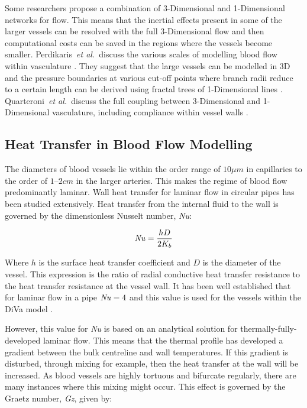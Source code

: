 \documentclass[11pt,english,a4paper,twoside,openright]{report}
\newcommand\Nuss{\mbox{\textit{Nu}}}
\newcommand\Graetz{\mbox{\textit{Gz}}}
\begin{document}
{{{{{{{{	Some researchers propose a combination of 3-Dimensional and 1-Dimensional networks for flow. This means that the inertial effects present in some of the larger vessels can be resolved with the full 3-Dimensional flow and then computational costs can be saved in the regions where the vessels become smaller. Perdikaris~\textit{et al.\ }discuss the various scales of modelling blood flow within vasculature \cite{perdikaris2016multiscale}. They suggest that the large vessels can be modelled in 3D and the pressure boundaries at various cut-off points where branch radii reduce to a certain length can be derived using fractal trees of 1-Dimensional lines \cite{perdikaris2015effective}. Quarteroni~\textit{et al.\ }discuss the full coupling between 3-Dimensional and 1-Dimensional vasculature, including compliance within vessel walls \cite{quarteroni2016geometric}.
	
	\subsection{Heat Transfer in Blood Flow Modelling}
	
	The diameters of blood vessels lie within the order range of $10\mu m$ in capillaries to the order of $1$--$2cm$ in the larger arteries. This makes the regime of blood flow predominantly laminar. Wall heat transfer for laminar flow in circular pipes has been studied extensively. Heat transfer from the internal fluid to the wall is governed by the dimensionless Nusselt number, \Nuss: 
	
	\begin{equation}  
	\Nuss = \frac{hD}{2K_{b}} 
	\label{Eq:NusseltNumber}
	\end{equation}
	
	Where $h$ is the surface heat transfer coefficient and $D$ is the diameter of the vessel. This expression is the ratio of radial conductive heat transfer resistance to the heat transfer resistance at the vessel wall. It has been well established that for laminar flow in a pipe $\Nuss=4$ \cite{bergman2011fundamentals} and this value is used for the vessels within the DiVa model \cite{kotte1996description}.
	
	However, this value for {\Nuss} is based on an analytical solution for thermally-fully-developed laminar flow. This means that the thermal profile has developed a gradient between the bulk centreline and wall temperatures. If this gradient is disturbed, through mixing for example, then the heat transfer at the wall will be increased. As blood vessels are highly tortuous and bifurcate regularly, there are many instances where this mixing might occur. This effect is governed by the Graetz number, {\Graetz}, given by:
	
}}}}}}}}
\end{document}
